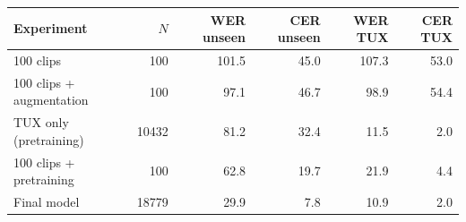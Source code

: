 \begin{tabular}{lrrrrr}
\toprule
Experiment & $N$ & WER unseen & CER unseen & WER TUX & CER TUX \\
\midrule
100 clips & 100 & 101.5 & 45.0 & 107.3 & 53.0 \\
100 clips + augmentation & 100 & 97.1 & 46.7 & 98.9 & 54.4 \\
TUX only (pretraining) & 10432 & 81.2 & 32.4 & 11.5 & 2.0 \\
100 clips + pretraining & 100 & 62.8 & 19.7 & 21.9 & 4.4 \\
Final model & 18779 & 29.9 & 7.8 & 10.9 & 2.0 \\
\bottomrule
\end{tabular}
